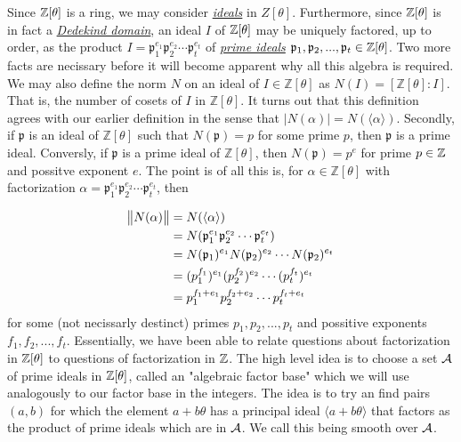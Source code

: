     Since $\mathbb{Z}[\theta]$ is a ring, we may consider \hyperref[ideal]{\textit{ideals}} in $Z[\theta]$. Furthermore, since $\mathbb{Z}[\theta]$ is in fact a \hyperref[dedekind]{\textit{Dedekind domain}}, an ideal $I$ of $\mathbb{Z}[\theta]$ may be uniquely factored, up to order, as the product $I = \mathfrak{p}_1^{e_1} \mathfrak{p}_2^{e_2} \cdots \mathfrak{p}_t^{e_t}$ of \hyperref[primeideal]{\textit{prime ideals}} $ \mathfrak{p}_1, \mathfrak{p}_2, ... , \mathfrak{p}_t \in \mathbb{Z}[\theta]$. Two more facts are necissary before it will become apparent why all this algebra is required. We may also define the norm $N$ on an ideal of $I \in \mathbb{Z}[\theta]$ as $N(I) = [\mathbb{Z}[\theta]: I]$. That is, the number of cosets of $I$ in $\mathbb{Z}[\theta]$. It turns out that this definition agrees with our earlier definition in the sense that $\mid N(\alpha)\mid  = N(\langle \alpha \rangle )$. Secondly, if $\mathfrak{p}$ is an ideal of $\mathbb{Z}[\theta]$ such that $N(\mathfrak{p}) = p$ for some prime $p$, then $\mathfrak{p}$ is a prime ideal. Conversly, if $\mathfrak{p}$ is a prime ideal of $\mathbb{Z}[\theta]$, then $N(\mathfrak{p}) = p^e$ for prime $p \in \mathbb{Z}$ and possitve exponent $e$. The point is of all this is, for $\alpha \in \mathbb{Z}[\theta]$ with factorization $\alpha = \mathfrak{p}_1^{e_1} \mathfrak{p}_2^{e_2} \cdots \mathfrak{p}_t^{e_t}$, then

    \begin{align*}
      \norm{N(\alpha)} & = N(\langle \alpha \rangle) \\
      &=N(\mathfrak{p}_1^{e_1} \mathfrak{p}_2^{e_2} \cdots \mathfrak{p}_t^{e_t}) \\
      &=N(\mathfrak{p}_1)^{e_1}N(\mathfrak{p}_2)^{e_2} \cdots N(\mathfrak{p}_2)^{e_t} \\
      &=(p_1^{f_1})^{e_1}(p_2^{f_2})^{e_2} \cdots (p_t^{f_t})^{e_t} \\
      &=p_1^{f_1 + e_1}p_2^{f_2 + e_2} \cdots p_t^{f_t + e_t}
    \end{align*}
    for some (not necissarly destinct) primes $p_1, p_2, ..., p_t$ and possitive exponents $f_1,f_2,...,f_t$. Essentially, we have been able to relate questions about factorization in $\mathbb{Z}[\theta]$ to questions of factorization in $\mathbb{Z}$. The high level idea is to choose a set $\mathcal{A}$ of prime ideals in $\mathbb{Z}[\theta]$, called an "algebraic factor base" which we will use analogously to our factor base in the integers. The idea is to try an find pairs $(a,b)$ for which the element $a + b \theta$ has a principal ideal $\langle a+ b \theta \rangle$ that factors as the product of prime ideals which are in $\mathcal{A}$. We call this being smooth over $\mathcal{A}$. \\

